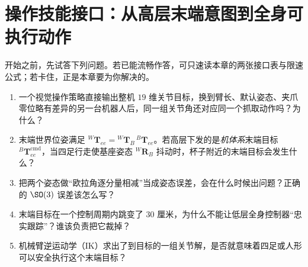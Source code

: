 \chapter{操作技能接口：从高层末端意图到全身可执行动作}\label{ch:mm-skill-interface}


\begin{practice}[前置自测]
开始之前，先试答下列问题。若已能流畅作答，可只速读本章的两张接口表与限速公式；若卡住，正是本章要为你解决的。
\begin{enumerate}
  \item 一个视觉操作策略直接输出整机 $19$ 维关节目标，换到臂长、默认姿态、夹爪零位略有差异的另一台机器人后，同一组关节角还对应同一个抓取动作吗？为什么？
  \item 末端世界位姿满足 ${}^{W}\mathbf{T}_{ee}={}^{W}\mathbf{T}_{B}\,{}^{B}\mathbf{T}_{ee}$。若高层下发的是\emph{机体系}末端目标 ${}^{B}\mathbf{T}_{ee}^{\mathrm{cmd}}$，当四足行走使基座姿态 ${}^{W}\mathbf{R}_{B}$ 抖动时，杯子附近的末端目标会发生什么？
  \item 把两个姿态做“欧拉角逐分量相减”当成姿态误差，会在什么时候出问题？正确的 $\SO(3)$ 误差该怎么写？
  \item 末端目标在一个控制周期内跳变了 $30$ 厘米，为什么不能让低层全身控制器“忠实跟踪”？谁该负责把它裁掉？
  \item 机械臂逆运动学（IK）求出了到目标的一组关节解，是否就意味着四足或人形可以安全执行这个末端目标？
\end{enumerate}
\end{practice}

